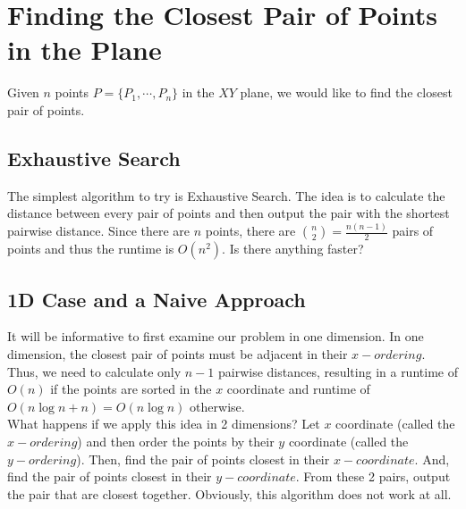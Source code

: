 \documentclass[11pt, a4paper, oneside]{book}
\theoremstyle{theoremdd}
\theoremstyle{remark}
\begin{document}
\section{Finding the Closest Pair of Points in the Plane}
Given $n$ points $P=\{P_{1},\cdots,P_{n}\}$ in the $XY$ plane, we would like to find the closest pair of points. 
\subsection{Exhaustive Search}
The simplest algorithm to try is Exhaustive Search. The idea is to calculate the distance between every pair of points and then output the pair with the shortest pairwise distance. Since there are $n$ points, there are $\binom{n}{2}=\frac{n(n-1)}{2}$ pairs of points and thus the runtime is $O(n^2)$. Is there anything faster?
\subsection{1D Case and a Naive Approach}
It will be informative to first examine our problem in one dimension. In one dimension, the closest pair of points must be adjacent in their $x-ordering$. Thus, we need to calculate only $n-1$ pairwise distances, resulting in a runtime of $O(n)$ if the points are sorted in the $x$ coordinate and runtime of $O(n\log n + n) = O(n\log n)$ otherwise. \\
What happens if we apply this idea in 2 dimensions? Let $x$ coordinate (called the $x-ordering$) and then order the points by their $y$ coordinate (called the $y-ordering$). Then, find the pair of points closest in their $x-coordinate$. And, find the pair of points closest in their $y-coordinate$. From these 2 pairs, output the pair that are closest together. Obviously, this algorithm does not work at all. 
\end{document}
